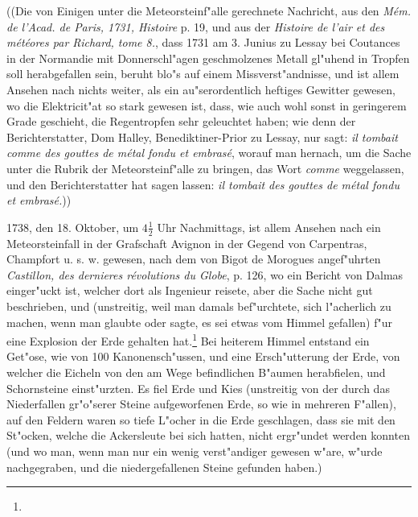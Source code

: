 \documentclass[a4paper, 11pt, oneside, polutonikogreek, german]{article}
\begin{document}
((Die von Einigen unter die Meteorsteinf"alle gerechnete Nachricht, aus den \emph{Mém. de l'Acad. de Paris, 1731, Histoire} p. 19, und aus der \emph{Histoire de l'air et des météores par Richard, tome 8.}, dass 1731 am 3. Junius zu Lessay bei Coutances in der Normandie mit Donnerschl"agen geschmolzenes Metall gl"uhend in Tropfen soll herabgefallen sein, beruht blo"s auf einem Missverst"andnisse, und ist allem Ansehen nach nichts weiter, als ein au"serordentlich heftiges Gewitter gewesen, wo die Elektricit"at so stark gewesen ist, dass, wie auch wohl sonst in geringerem Grade geschieht, die Regentropfen sehr geleuchtet haben; wie denn der Berichterstatter, Dom Halley, Benediktiner-Prior zu Lessay, nur sagt: \emph{il tombait comme des gouttes de métal fondu et embrasé}, worauf man hernach, um die Sache unter die Rubrik der Meteorsteinf"alle zu bringen, das Wort \emph{comme} weggelassen, und den Berichterstatter hat sagen lassen: \emph{il tombait des gouttes de métal fondu et embrasé.}))

1738, den 18. Oktober, um $\mathfrak{4\frac{1}{2}}$ Uhr Nachmittags, ist allem Ansehen nach ein Meteorsteinfall in der Grafschaft Avignon in der Gegend von Carpentras, Champfort u. s. w. gewesen, nach dem von Bigot de Morogues angef"uhrten \emph{Castillon, des dernieres révolutions du Globe}, p. 126, wo ein Bericht von Dalmas einger"uckt ist, welcher dort als Ingenieur reisete, aber die Sache nicht gut beschrieben, und (unstreitig, weil man damals bef"urchtete, sich l"acherlich zu machen, wenn man glaubte oder sagte, es sei etwas vom Himmel gefallen) f"ur eine Explosion der Erde gehalten hat.\footnote{} Bei heiterem Himmel entstand ein Get"ose, wie von 100 Kanonensch"ussen, und eine Ersch"utterung der Erde, von welcher die Eicheln von den am Wege befindlichen B"aumen herabfielen, und Schornsteine einst"urzten. Es fiel Erde und Kies (unstreitig von der durch das Niederfallen gr"o"serer Steine aufgeworfenen Erde, so wie in mehreren F"allen), auf den Feldern waren so tiefe L"ocher in die Erde geschlagen, dass sie mit den St"ocken, welche die Ackersleute bei sich hatten, nicht ergr"undet werden konnten (und wo man, wenn man nur ein wenig verst"andiger gewesen w"are, w"urde nachgegraben, und die niedergefallenen Steine gefunden haben.)
\end{document}
